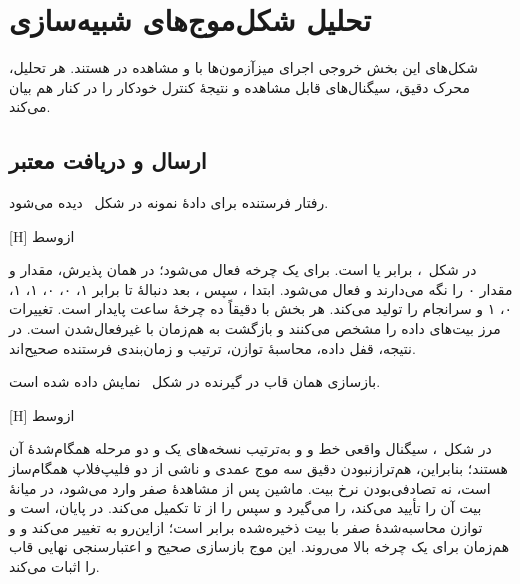 \section{تحلیل شکل‌موج‌های شبیه‌سازی}

شکل‌های این بخش خروجی اجرای میزآزمون‌ها با  و مشاهده در
 هستند. هر تحلیل، محرک دقیق، سیگنال‌های قابل مشاهده و نتیجهٔ کنترل خودکار را
در کنار هم بیان می‌کند.


\subsection{ارسال و دریافت معتبر}

رفتار فرستنده برای دادهٔ نمونه در شکل~ دیده می‌شود.

[H]
‌ازوسط

در شکل~،  برابر  یا
 است.  برای یک چرخه فعال می‌شود؛ در همان پذیرش،
 مقدار  و  مقدار ۰ را نگه می‌دارند و
 فعال می‌شود.  ابتدا ، سپس ، بعد دنبالهٔ
 تا  برابر ۱، ۰، ۰، ۱، ۱، ۰، ۱ و سرانجام  را تولید
می‌کند. هر بخش با  دقیقاً ده چرخهٔ ساعت پایدار است. تغییرات
 مرز بیت‌های داده را مشخص می‌کنند و بازگشت  به 
هم‌زمان با غیرفعال‌شدن  است. در نتیجه، قفل داده، محاسبهٔ توازن، ترتیب
 و زمان‌بندی فرستنده صحیح‌اند.

بازسازی همان قاب در گیرنده در شکل~ نمایش داده شده است.

[H]
‌ازوسط

در شکل~،  سیگنال واقعی خط و  و
 به‌ترتیب نسخه‌های یک و دو مرحله همگام‌شدهٔ آن هستند؛ بنابراین،
هم‌ترازنبودن دقیق سه موج عمدی و ناشی از دو فلیپ‌فلاپ همگام‌ساز است، نه تصادفی‌بودن نرخ
بیت. ماشین پس از مشاهدهٔ صفر وارد  می‌شود، در میانهٔ بیت آن را تأیید می‌کند،
 را می‌گیرد و سپس  را از  تا 
تکمیل می‌کند. در پایان،  است و توازن محاسبه‌شدهٔ صفر با بیت ذخیره‌شده برابر
است؛ ازاین‌رو  به  تغییر می‌کند و  و
 هم‌زمان برای یک چرخه بالا می‌روند. این موج بازسازی صحیح و
اعتبارسنجی نهایی قاب را اثبات می‌کند.


